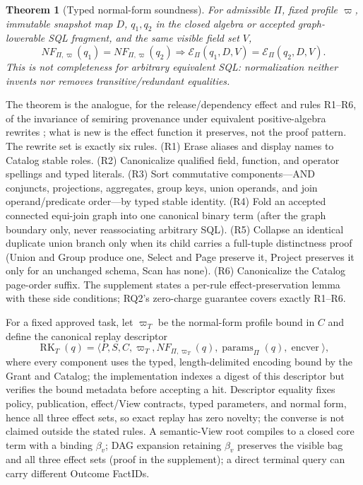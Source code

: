 \documentclass[10pt,journal,compsoc]{IEEEtran}
\newcommand{\effect}{\mathcal{E}}
\newtheorem{theorem}{Theorem}
\begin{document}
\begin{theorem}[Typed normal-form soundness]
\label{thm:nf-soundness}
For admissible $\Pi$, fixed profile $\varpi$, immutable snapshot map $D$, $q_1,q_2$ in the closed
algebra or accepted graph-lowerable SQL fragment, and the same visible field
set $V$,
\[
 NF_{\Pi,\varpi}(q_1)=NF_{\Pi,\varpi}(q_2)\Longrightarrow
 \effect_\Pi(q_1,D,V)=\effect_\Pi(q_2,D,V).
\]
This is not completeness for arbitrary equivalent SQL: normalization neither
invents nor removes transitive/redundant equalities.
\end{theorem}
The theorem is the analogue, for the release/dependency effect and rules
R1--R6, of the invariance of semiring provenance under equivalent
positive-algebra rewrites \cite{green2007provenance,amsterdamer2011aggregate};
what is new is the effect function it preserves, not the proof pattern.
The rewrite set is exactly six rules. (R1) Erase aliases and display names
to Catalog stable roles. (R2) Canonicalize qualified field, function, and
operator spellings and typed literals. (R3) Sort commutative components---AND
conjuncts, projections, aggregates, group keys, union operands, and join
operand/predicate order---by typed stable identity. (R4) Fold an accepted
connected equi-join graph into one canonical binary term (after the graph
boundary only, never reassociating arbitrary SQL). (R5) Collapse an
identical duplicate union branch only when its child carries a full-tuple
distinctness proof (Union and Group produce one, Select and Page preserve
it, Project preserves it only for an unchanged schema, Scan has none).
(R6) Canonicalize the Catalog page-order suffix. The supplement states a
per-rule effect-preservation lemma with these side conditions; RQ2's
zero-charge guarantee covers exactly R1--R6.

For a fixed approved task, let $\varpi_T$ be the normal-form profile bound in
$C$ and define the canonical replay descriptor
\begin{equation}
 \operatorname{RK}_T(q)=\langle P,S,C,\varpi_T,NF_{\Pi,\varpi_T}(q),
     \operatorname{params}_\Pi(q),\operatorname{encver}\rangle,
 \label{eq:replay-descriptor}
\end{equation}
where every component uses the typed, length-delimited encoding bound by the
Grant and Catalog; the implementation indexes a digest of this descriptor but
verifies the bound metadata before accepting a hit. Descriptor equality fixes
policy, publication, effect/View contracts, typed parameters, and normal form,
hence all three effect sets, so exact replay has zero novelty; the converse is
not claimed outside the stated rules. A semantic-View root compiles to a
closed core term with a binding $\beta_v$; DAG expansion retaining
$\beta_v$ preserves the visible bag and all three effect sets (proof in the
supplement); a direct terminal query can carry different Outcome FactIDs.
\end{document}

